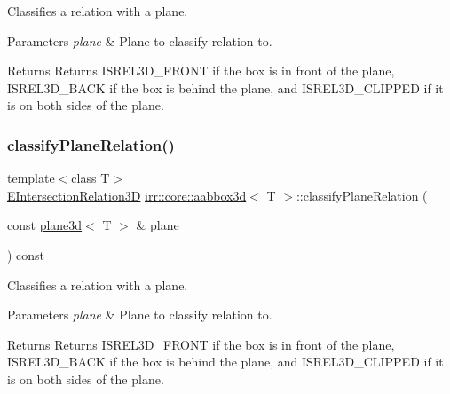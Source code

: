 Classifies a relation with a plane. 


\begin{DoxyParams}{Parameters}
{\em plane} & Plane to classify relation to. \\
\hline
\end{DoxyParams}
\begin{DoxyReturn}{Returns}
Returns I\+S\+R\+E\+L3\+D\+\_\+\+F\+R\+O\+NT if the box is in front of the plane, I\+S\+R\+E\+L3\+D\+\_\+\+B\+A\+CK if the box is behind the plane, and I\+S\+R\+E\+L3\+D\+\_\+\+C\+L\+I\+P\+P\+ED if it is on both sides of the plane. 
\end{DoxyReturn}
\mbox{\label{classirr_1_1core_1_1aabbox3d_aa2a6c5613392e34552a31fe7b46286b1}} 
\subsubsection{\texorpdfstring{classify\+Plane\+Relation()}{classifyPlaneRelation()}\hspace{0.1cm}{\footnotesize\ttfamily [2/2]}}
{\footnotesize\ttfamily template$<$class T$>$ \\
\hyperlink{namespaceirr_1_1core_a8a9999eb0d151083f48afe5f7d17a96c}{E\+Intersection\+Relation3D} \hyperlink{classirr_1_1core_1_1aabbox3d}{irr\+::core\+::aabbox3d}$<$ T $>$\+::classify\+Plane\+Relation (\begin{DoxyParamCaption}\item[{const \hyperlink{classirr_1_1core_1_1plane3d}{plane3d}$<$ T $>$ \&}]{plane }\end{DoxyParamCaption}) const\hspace{0.3cm}{\ttfamily [inline]}}



Classifies a relation with a plane. 


\begin{DoxyParams}{Parameters}
{\em plane} & Plane to classify relation to. \\
\hline
\end{DoxyParams}
\begin{DoxyReturn}{Returns}
Returns I\+S\+R\+E\+L3\+D\+\_\+\+F\+R\+O\+NT if the box is in front of the plane, I\+S\+R\+E\+L3\+D\+\_\+\+B\+A\+CK if the box is behind the plane, and I\+S\+R\+E\+L3\+D\+\_\+\+C\+L\+I\+P\+P\+ED if it is on both sides of the plane. 
\end{DoxyReturn}
\mbox{\label{classirr_1_1core_1_1aabbox3d_ad2e956303fd85f900f93c067fd9c2647}} 
